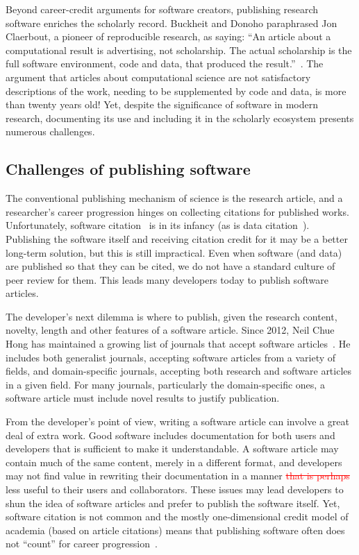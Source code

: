 \documentclass{article}
\newcommand{\delete}[1]{\sloppy\cbcolor{red}\textcolor{red}{\cbdelete \sout{#1}}}
\begin{document}
Beyond career-credit arguments for software creators, publishing research software enriches the scholarly record. Buckheit and Donoho paraphrased Jon Claerbout, a pioneer of reproducible research, as saying: ``An article about a computational result is advertising, not scholarship. The actual scholarship is the full software environment, code and data, that produced the result.''~\cite{Buckheit1995}.
The argument that articles about computational science are not satisfactory descriptions of the work, needing to be supplemented by code and data, is more than twenty years old! Yet, despite the significance of software in modern research, documenting its use and including it in the scholarly ecosystem presents numerous challenges.


\subsection{Challenges of publishing software}


The conventional publishing mechanism of science is the research article, and a researcher's career progression hinges on collecting citations for published works.
Unfortunately, software citation~\cite{Smith2016} is in its infancy (as is data citation~\cite{data-citation,10.7717/peerj-cs.1}).
Publishing the software itself and receiving citation credit for it may be a better long-term solution, but this is still impractical.
Even when software (and data) are published so that they can be cited, we do not have a standard culture of peer review for them. This leads many developers today to publish software articles.


The developer's next dilemma is where to publish, given the research content, novelty, length and other features of a software article.
%
Since 2012, Neil Chue Hong has maintained a growing list of journals that accept software articles~\cite{software-papers-list}.
He includes both generalist journals, accepting software articles from a variety of fields, and domain-specific journals, accepting both research and software articles in a given field.
%
For many journals, particularly the domain-specific ones, a software article must include novel results to justify publication.

From the developer's point of view, writing a software article can involve a great deal of extra work. Good software includes documentation for both users and developers that is sufficient to make it understandable. A software article may contain much of the same content, merely in a different format, and developers may not find value in rewriting their documentation in a manner \delete{that is perhaps} less useful to their users and collaborators.
These issues may lead developers to shun the idea of software articles and prefer to publish the software itself. Yet, software citation is not common and the mostly one-dimensional credit model of academia (based on article citations) means that publishing software often does not ``count'' for career progression~\cite{Smith2016,Niemeyer:2016sc}.
\end{document}
